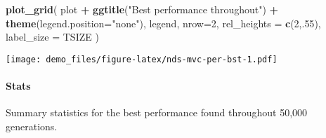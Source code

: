 \documentclass[]{book}
\newenvironment{Shaded}{\begin{snugshade}}{\end{snugshade}}
\newcommand{\DataTypeTok}[1]{\textcolor[rgb]{0.13,0.29,0.53}{#1}}
\newcommand{\DecValTok}[1]{\textcolor[rgb]{0.00,0.00,0.81}{#1}}
\newcommand{\FloatTok}[1]{\textcolor[rgb]{0.00,0.00,0.81}{#1}}
\newcommand{\KeywordTok}[1]{\textcolor[rgb]{0.13,0.29,0.53}{\textbf{#1}}}
\newcommand{\NormalTok}[1]{#1}
\newcommand{\OperatorTok}[1]{\textcolor[rgb]{0.81,0.36,0.00}{\textbf{#1}}}
\newcommand{\OtherTok}[1]{\textcolor[rgb]{0.56,0.35,0.01}{#1}}
\newcommand{\StringTok}[1]{\textcolor[rgb]{0.31,0.60,0.02}{#1}}
\let\oldparagraph\paragraph
\renewcommand{\paragraph}[1]{\oldparagraph{#1}\mbox{}}
\begin{document}
\begin{Shaded}
\begin{Highlighting}[]
\KeywordTok{plot_grid}\NormalTok{(}
\NormalTok{  plot }\OperatorTok{+}
\StringTok{    }\KeywordTok{ggtitle}\NormalTok{(}\StringTok{"Best performance throughout"}\NormalTok{) }\OperatorTok{+}
\StringTok{    }\KeywordTok{theme}\NormalTok{(}\DataTypeTok{legend.position=}\StringTok{"none"}\NormalTok{),}
\NormalTok{  legend,}
  \DataTypeTok{nrow=}\DecValTok{2}\NormalTok{,}
  \DataTypeTok{rel_heights =} \KeywordTok{c}\NormalTok{(}\DecValTok{2}\NormalTok{,.}\DecValTok{55}\NormalTok{),}
  \DataTypeTok{label_size =}\NormalTok{ TSIZE}
\NormalTok{)}
\end{Highlighting}
\end{Shaded}

\texttt{[image: demo\_files/figure-latex/nds-mvc-per-bst-1.pdf]}

\hypertarget{stats-73}{%
\paragraph{Stats}\label{stats-73}}

Summary statistics for the best performance found throughout 50,000 generations.

\begin{Shaded}
\end{Shaded}
\end{document}
